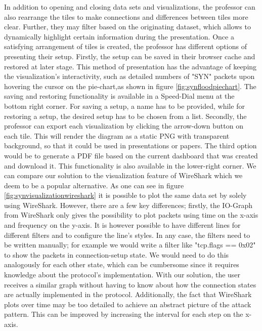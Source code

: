 In addition to opening and closing data sets and visualizations, the professor can also rearrange the tiles to make connections and differences between tiles more clear. Further, they may filter based on the originating dataset, which allows to dynamically highlight certain information during the presentation. Once a satisfying arrangement of tiles is created, the professor has different options of presenting their setup. Firstly, the setup can be saved in their browser cache and restored at later stage. This method of presentation has the advantage of keeping the visualization's interactivity, such as detailed numbers of "SYN" packets upon hovering the cursor on the pie-chart,as shown in figure \ref{fig:synfloodpiechart}. 
The saving and  restoring functionality is available in a Speed-Dial menu at the bottom right corner. For saving a setup, a name has to be provided, while for restoring a setup, the desired setup has to be chosen from a list.
Secondly, the professor can export each visualization by clicking the arrow-down button on each tile. This will render the diagram as a static PNG with transparent background, so that it could be used in presentations or papers.
The third option would be to generate a PDF file based on the current dashboard that was created and download it. This functionality is also available in the lower-right corner.
We can compare our solution to the visualization feature of WireShark which we deem to be a popular alternative.
As one can see in figure \ref{fig:synvisualizationwireshark} it is possible to plot the same data set by solely using WireShark. However, there are a few key differences; firstly, the IO-Graph from WireShark only gives the possibility to plot packets using time on the x-axis and frequency on the y-axis. It is however possible to have different lines for different filters and to configure the line's styles. In any case, the filters need to be written manually; for example we would write a filter like "tcp.flags == 0x02" to show the packets in connection-setup state. We would need to do this analogously for each other state, which can be cumbersome since it requires knowledge about the protocol's implementation. With our solution, the user receives a similar graph without having to know about how the connection states are actually implemented in the protocol. Additionally, the fact that WireShark plots over time may be too detailed to achieve an abstract picture of the attack pattern. This can be improved by increasing the interval for each step on the x-axis.
